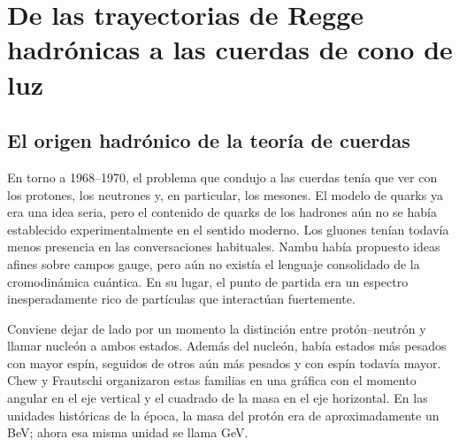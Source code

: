 \chapter{De las trayectorias de Regge hadrónicas a las cuerdas de cono de luz}


\section{El origen hadrónico de la teoría de cuerdas}

En torno a 1968--1970, el problema que condujo a las cuerdas tenía que ver con los protones,
los neutrones y, en particular, los mesones. El modelo de quarks ya era una idea
seria, pero el contenido de quarks de los hadrones aún no se había establecido
experimentalmente en el sentido moderno. Los gluones tenían todavía menos presencia en las conversaciones habituales.
Nambu había propuesto ideas afines sobre campos gauge, pero aún no existía el lenguaje consolidado de
la cromodinámica cuántica. En su lugar, el punto de partida era un
espectro inesperadamente rico de partículas que interactúan fuertemente.

Conviene dejar de lado por un momento la distinción entre protón--neutrón y llamar nucleón
a ambos estados. Además del nucleón, había estados más pesados con mayor
espín, seguidos de otros aún más pesados y con espín todavía mayor. Chew y
Frautschi organizaron estas familias en una gráfica con el momento angular en el
eje vertical y el cuadrado de la masa en el eje horizontal. En las
unidades históricas de la época, la masa del protón era de aproximadamente un BeV; ahora esa misma unidad se
llama GeV.

